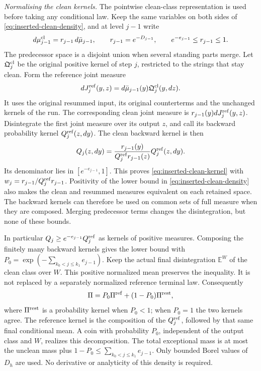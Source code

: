 \documentclass[11pt,letterpaper,reqno]{amsart}
\theoremstyle{definition}
\theoremstyle{remark}
\begin{document}
\emph{Normalising the clean kernels.}
The pointwise clean-class representation is used before taking any
conditional law. Keep the same variables on both sides of
\eqref{eq:inserted-clean-density}, and at level $j-1$ write
\[
 d\mu_{j-1}^{\rm cl}=r_{j-1}\,d\bar\mu_{j-1},\qquad
 r_{j-1}=e^{-D_{j-1}},\qquad e^{-e_{j-1}}\le r_{j-1}\le1.
\]
The predecessor space is a disjoint union when several standing
parts merge. Let $\mathfrak Q_j^{\rm cl}$ be the original positive kernel of
step $j$, restricted to the strings that stay clean. Form the
reference joint measure
\[
 dJ_j^{\rm ref}(y,z)=d\bar\mu_{j-1}(y)\mathfrak Q_j^{\rm cl}(y,dz).
\]
It uses the original resummed input, its original counterterms and
the unchanged kernels of the run. The corresponding clean joint
measure is $r_{j-1}(y)dJ_j^{\rm ref}(y,z)$. Disintegrate the first
joint measure over its output $z$, and call its backward probability
kernel $Q_j^{\rm ref}(z,dy)$. The clean backward kernel is then
\[
 Q_j(z,dy)=
 \frac{r_{j-1}(y)}{Q_j^{\rm ref}r_{j-1}(z)}
                                  Q_j^{\rm ref}(z,dy).
\]
Its denominator lies in $[e^{-e_{j-1}},1]$. This proves
\eqref{eq:inserted-clean-kernel} with
$w_j=r_{j-1}/Q_j^{\rm ref}r_{j-1}$. Positivity of the lower
bound in \eqref{eq:inserted-clean-density} also makes the clean
and resummed measures equivalent on each retained space. The
backward kernels can therefore be used on common sets of full
measure when they are composed. Merging predecessor terms changes
the disintegration, but none of these bounds.

In particular $Q_j\ge e^{-e_{j-1}}Q_j^{\rm ref}$ as kernels of
positive measures. Composing the finitely many backward kernels
gives the lower bound with
$P_0=\exp(-\sum_{k_0<j\le k_1}e_{j-1})$.
Keep the actual final disintegration $\mathbb E^W$ of the clean
class over $W$. This positive normalized mean preserves the
inequality. It is not replaced by a separately normalized reference
terminal law.
Consequently
\[
 \Pi=P_0\Pi^{\rm ref}+(1-P_0)\Pi^{\rm rest},
\]
where $\Pi^{\rm rest}$ is a probability kernel when $P_0<1$;
when $P_0=1$ the two kernels agree. The reference kernel is the
composition of the $Q_j^{\rm ref}$, followed by that same final
conditional mean. A coin with probability $P_0$, independent of
the output class and $W$, realizes this decomposition. The total
exceptional mass is at most the unclean mass plus
$1-P_0\le\sum_{k_0<j\le k_1}e_{j-1}$.
Only bounded Borel values of $D_h$
are used. No derivative or analyticity of this density is required.
\end{document}
